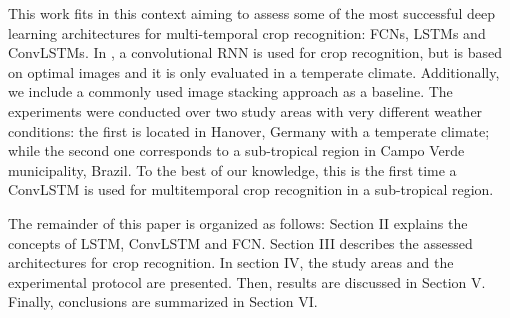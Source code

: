 This work fits in this context aiming to assess some of the most successful deep learning architectures for multi-temporal crop recognition: FCNs, LSTMs and ConvLSTMs. %
In \cite{russwurm2018multi}, a convolutional RNN is used for crop recognition, but is based on optimal images and it is only evaluated in a temperate climate. Additionally, we include a commonly used image stacking approach as a baseline. The experiments were conducted over two study areas with very different weather conditions: the first is located in Hanover, Germany with a temperate climate; while the second one corresponds to a sub-tropical region in Campo Verde municipality, Brazil. To the best of our knowledge, this is the first time a ConvLSTM is used for multitemporal crop recognition in a sub-tropical region.

The remainder of this paper is organized as follows: Section II explains the concepts of LSTM, ConvLSTM and FCN. Section III describes the assessed architectures for crop recognition. In section IV, the study areas and the experimental protocol are presented. Then, results are discussed in Section V. Finally, conclusions are summarized in Section VI.